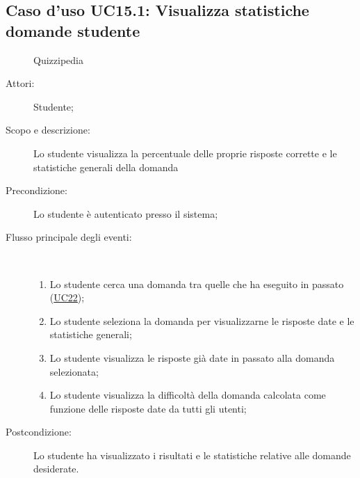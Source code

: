 \subsection{Caso d'uso UC15.1: Visualizza statistiche domande studente}
	\begin{figure}[H]
		\centering
		\begin{resizedtikzpicture}{\textwidth}
		\begin{umlsystem}[x=0, fill=lightgray!20]{Quizzipedia}
		\end{umlsystem}
		\end{resizedtikzpicture}
		\caption{}
	\end{figure}
\begin{description}
\item[Attori:] Studente;
\item[Scopo e descrizione:] Lo studente visualizza la percentuale delle proprie risposte corrette e le statistiche generali della domanda
      \item[Precondizione:] Lo studente è autenticato presso il sistema;

        \item[Flusso principale degli eventi:] \ 
 \begin{enumerate}
          \item Lo studente cerca una domanda tra quelle che ha eseguito in passato (\hyperlink{UC22}{UC22});
          \item Lo studente seleziona la domanda per visualizzarne le risposte date e le statistiche generali;
          \item Lo studente visualizza le risposte già date in passato alla domanda selezionata;
          \item Lo studente visualizza la difficoltà della domanda calcolata come funzione delle risposte date da tutti gli utenti;

      \end{enumerate}
    \item[Postcondizione:] Lo studente ha visualizzato i risultati e le statistiche relative alle domande desiderate.
  \end{description}
\hypertarget{UC15.2}{}
